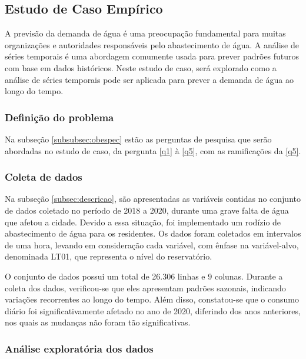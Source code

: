 \subsection{Estudo de Caso Emp\'irico}\label{subsec:estudo-de-caso-base}


A previsão da demanda de água é uma preocupação fundamental para muitas organizações e autoridades responsáveis pelo abastecimento de água. A análise de séries temporais é uma abordagem comumente usada para prever padrões futuros com base em dados históricos. Neste estudo de caso, será explorado como a análise de séries temporais pode ser aplicada para prever a demanda de água ao longo do tempo.



\subsubsection{Defini\c c\~ao do problema}



Na subseção \ref{subsubsec:obespec} estão as perguntas de pesquisa que serão abordadas no estudo de caso, da pergunta \ref{q1} à \ref{q5}, com as ramificações da \ref{q5}.

\subsubsection{Coleta de dados}


Na subseção \ref{subsec:descricao}, são apresentadas as variáveis contidas no conjunto de dados coletado no período de 2018 a 2020, durante uma grave falta de água que afetou a cidade. Devido a essa situação, foi implementado um rodízio de abastecimento de água para os residentes. Os dados foram coletados em intervalos de uma hora, levando em consideração cada variável, com ênfase na variável-alvo, denominada LT01, que representa o nível do reservatório.

O conjunto de dados possui um total de 26.306 linhas e 9 colunas. Durante a coleta dos dados, verificou-se que eles apresentam padrões sazonais, indicando variações recorrentes ao longo do tempo. Além disso, constatou-se que o consumo diário foi significativamente afetado no ano de 2020, diferindo dos anos anteriores, nos quais as mudanças não foram tão significativas.



\subsubsection{An\'alise explorat\'oria dos dados}



